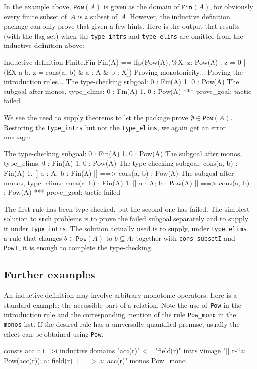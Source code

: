 In the example above, $\texttt{Pow}(A)$ is given as the domain of
$\texttt{Fin}(A)$, for obviously every finite subset of~$A$ is a subset
of~$A$.  However, the inductive definition package can only prove that given a
few hints.
Here is the output that results (with the flag set) when the
\texttt{type_intrs} and \texttt{type_elims} are omitted from the inductive
definition above:
\begin{ttbox}
Inductive definition Finite.Fin
Fin(A) ==
lfp(Pow(A),
    \%X. {z: Pow(A) . z = 0 | (EX a b. z = cons(a, b) & a : A & b : X)})
  Proving monotonicity...
\ttbreak
  Proving the introduction rules...
The type-checking subgoal:
0 : Fin(A)
 1. 0 : Pow(A)
\ttbreak
The subgoal after monos, type_elims:
0 : Fin(A)
 1. 0 : Pow(A)
*** prove_goal: tactic failed
\end{ttbox}
We see the need to supply theorems to let the package prove
$\emptyset\in\texttt{Pow}(A)$.  Restoring the \texttt{type_intrs} but not the
\texttt{type_elims}, we again get an error message:
\begin{ttbox}
The type-checking subgoal:
0 : Fin(A)
 1. 0 : Pow(A)
\ttbreak
The subgoal after monos, type_elims:
0 : Fin(A)
 1. 0 : Pow(A)
\ttbreak
The type-checking subgoal:
cons(a, b) : Fin(A)
 1. [| a : A; b : Fin(A) |] ==> cons(a, b) : Pow(A)
\ttbreak
The subgoal after monos, type_elims:
cons(a, b) : Fin(A)
 1. [| a : A; b : Pow(A) |] ==> cons(a, b) : Pow(A)
*** prove_goal: tactic failed
\end{ttbox}
The first rule has been type-checked, but the second one has failed.  The
simplest solution to such problems is to prove the failed subgoal separately
and to supply it under \texttt{type_intrs}.  The solution actually used is
to supply, under \texttt{type_elims}, a rule that changes
$b\in\texttt{Pow}(A)$ to $b\subseteq A$; together with \texttt{cons_subsetI}
and \texttt{PowI}, it is enough to complete the type-checking.



\subsection{Further examples}

An inductive definition may involve arbitrary monotonic operators.  Here is a
standard example: the accessible part of a relation.  Note the use
of~\texttt{Pow} in the introduction rule and the corresponding mention of the
rule \verb|Pow_mono| in the \texttt{monos} list.  If the desired rule has a
universally quantified premise, usually the effect can be obtained using
\texttt{Pow}.
\begin{ttbox}
consts  acc :: i=>i
inductive
  domains "acc(r)" <= "field(r)"
  intrs
    vimage  "[| r-``{a}: Pow(acc(r)); a: field(r) |] ==> a: acc(r)"
  monos      Pow_mono
\end{ttbox}

